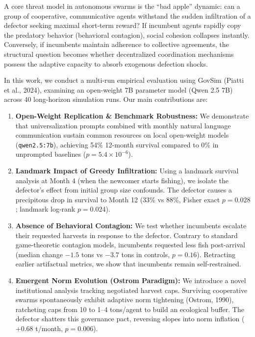 ﻿\documentclass[11pt,a4paper]{article}
\begin{document}
A core threat model in autonomous swarms is the ``bad apple'' dynamic: can a group of cooperative, communicative agents withstand the sudden infiltration of a defector seeking maximal short-term reward? If incumbent agents rapidly copy the predatory behavior (behavioral contagion), social cohesion collapses instantly. Conversely, if incumbents maintain adherence to collective agreements, the structural question becomes whether decentralized coordination mechanisms possess the adaptive capacity to absorb exogenous defection shocks.

In this work, we conduct a multi-run empirical evaluation using GovSim (Piatti et al., 2024), examining an open-weight 7B parameter model (Qwen 2.5 7B) across 40 long-horizon simulation runs. Our main contributions are:
\begin{enumerate}[leftmargin=*,itemsep=1pt]
    \item \textbf{Open-Weight Replication \& Benchmark Robustness:} We demonstrate that universalization prompts combined with monthly natural language communication sustain common resources on local open-weight models (\texttt{qwen2.5:7b}), achieving 54\% 12-month survival compared to 0\% in unprompted baselines ($p = 5.4 \times 10^{-6}$).
    \item \textbf{Landmark Impact of Greedy Infiltration:} Using a landmark survival analysis at Month 4 (when the newcomer starts fishing), we isolate the defector's effect from initial group size confounds. The defector causes a precipitous drop in survival to Month 12 (33\% vs 88\%, Fisher exact $p = 0.028$; landmark log-rank $p = 0.024$).
    \item \textbf{Absence of Behavioral Contagion:} We test whether incumbents escalate their requested harvests in response to the defector. Contrary to standard game-theoretic contagion models, incumbents requested less fish post-arrival (median change $-1.5$ tons vs $-3.7$ tons in controls, $p = 0.16$). Retracting earlier artifactual metrics, we show that incumbents remain self-restrained.
    \item \textbf{Emergent Norm Evolution (Ostrom Paradigm):} We introduce a novel institutional analysis tracking negotiated harvest caps. Surviving cooperative swarms spontaneously exhibit adaptive norm tightening (Ostrom, 1990), ratcheting caps from 10 to 1--4 tons/agent to build an ecological buffer. The defector shatters this governance pact, reversing slopes into norm inflation ($+0.68$ t/month, $p = 0.006$).
\end{enumerate}
\end{document}
